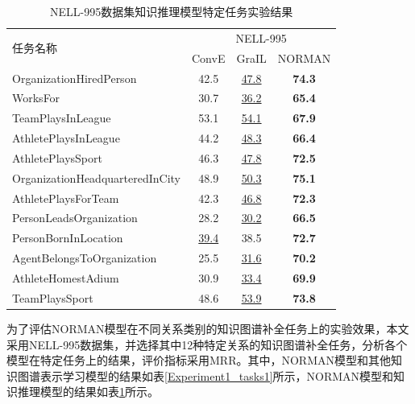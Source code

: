 \documentclass[algorithmlist, AutoFakeBold, AutoFakeSlant, figurelist, tablelist, nomlist, engineering, openany]{seuthesix} %
\begin{document}
\begin{table}[t]
  \centering
  \caption{NELL-995数据集知识推理模型特定任务实验结果}
  \begin{tabular*}{0.95\textwidth}{@{\extracolsep{\fill}}lccc}
    \toprule[1pt]
    \multirow{2}{*}{\small{任务名称}} & \multicolumn{3}{c}{\small{NELL-995}} \\
      & \small{ConvE} & \small{GraIL} & \small{NORMAN} \\ \hline
    \small{OrganizationHiredPerson} & 42.5 & \underline{47.8} & \textbf{74.3} \\
    \small{WorksFor} & 30.7 & \underline{36.2} & \textbf{65.4} \\
    \small{TeamPlaysInLeague} & 53.1 & \underline{54.1} & \textbf{67.9} \\
    \small{AthletePlaysInLeague} & 44.2 & \underline{48.3} & \textbf{66.4} \\
    \small{AthletePlaysSport} & 46.3 & \underline{47.8} & \textbf{72.5} \\
    \small{OrganizationHeadquarteredInCity} & 48.9 & \underline{50.3} & \textbf{75.1} \\
    \small{AthletePlaysForTeam} & 42.3 & \underline{46.8} & \textbf{72.3} \\
    \small{PersonLeadsOrganization} & 28.2 & \underline{30.2} & \textbf{66.5} \\
    \small{PersonBornInLocation} & \underline{39.4} & 38.5 & \textbf{72.7} \\
    \small{AgentBelongsToOrganization} & 25.5 & \underline{31.6} & \textbf{70.2} \\
    \small{AthleteHomestAdium} & 30.9 & \underline{33.4} & \textbf{69.9} \\
    \small{TeamPlaysSport} & 48.6 & \underline{53.9} & \textbf{73.8} \\
    \bottomrule[1pt]
  \end{tabular*}
  \label{Experiment1_tasks2}
\end{table}

为了评估NORMAN模型在不同关系类别的知识图谱补全任务上的实验效果，本文采用NELL-995数据集，并选择其中12种特定关系的知识图谱补全任务，分析各个模型在特定任务上的结果，评价指标采用MRR。其中，NORMAN模型和其他知识图谱表示学习模型的结果如表\ref{Experiment1_tasks1}所示，NORMAN模型和知识推理模型的结果如表\ref{Experiment1_tasks2}所示。
\end{document}
